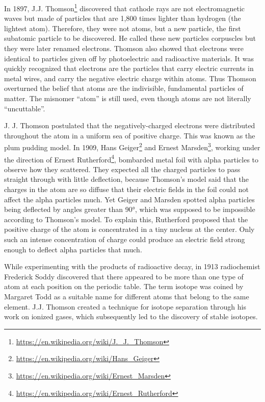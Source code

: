 \documentclass[
]{article}
\let\rmarkdownfootnote\footnote%
\def\footnote{\protect\rmarkdownfootnote}
\renewcommand{\href}[2]{#2\footnote{\url{#1}}}
\theoremstyle{definition}
\theoremstyle{definition}
\theoremstyle{definition}
\theoremstyle{remark}
\begin{document}
In 1897, \href{https://en.wikipedia.org/wiki/J._J._Thomson}{J.J.
Thomson} discovered that cathode rays are not electromagnetic waves but
made of particles that are 1,800 times lighter than hydrogen (the
lightest atom). Therefore, they were not atoms, but a new particle, the
first subatomic particle to be discovered. He called these new particles
corpuscles but they were later renamed electrons. Thomson also showed
that electrons were identical to particles given off by photoelectric
and radioactive materials. It was quickly recognized that electrons are
the particles that carry electric currents in metal wires, and carry the
negative electric charge within atoms. Thus Thomson overturned the
belief that atoms are the indivisible, fundamental particles of matter.
The misnomer ``atom'' is still used, even though atoms are not literally
``uncuttable''.

J. J. Thomson postulated that the negatively-charged electrons were
distributed throughout the atom in a uniform sea of positive charge.
This was known as the plum pudding model. In 1909,
\href{https://en.wikipedia.org/wiki/Hans_Geiger}{Hans Geiger} and
\href{https://en.wikipedia.org/wiki/Ernest_Marsden}{Ernest Marsden},
working under the direction of
\href{https://en.wikipedia.org/wiki/Ernest_Rutherford}{Ernest
Rutherford}, bombarded metal foil with alpha particles to observe how
they scattered. They expected all the charged particles to pass straight
through with little deflection, because Thomson's model said that the
charges in the atom are so diffuse that their electric fields in the
foil could not affect the alpha particles much. Yet Geiger and Marsden
spotted alpha particles being deflected by angles greater than 90°,
which was supposed to be impossible according to Thomson's model. To
explain this, Rutherford proposed that the positive charge of the atom
is concentrated in a tiny nucleus at the center. Only such an intense
concentration of charge could produce an electric field strong enough to
deflect alpha particles that much.

While experimenting with the products of radioactive decay, in 1913
radiochemist Frederick Soddy discovered that there appeared to be more
than one type of atom at each position on the periodic table. The term
isotope was coined by Margaret Todd as a suitable name for different
atoms that belong to the same element. J.J. Thomson created a technique
for isotope separation through his work on ionized gases, which
subsequently led to the discovery of stable isotopes.
\end{document}
